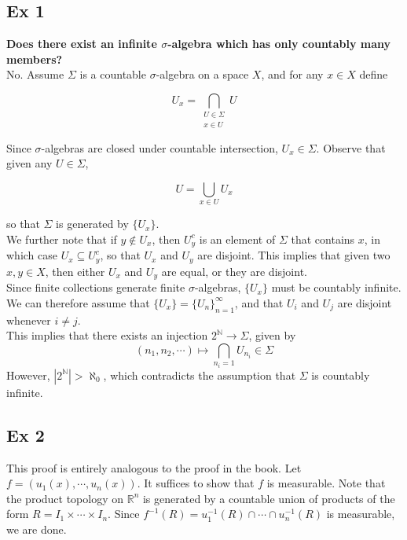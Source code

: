 \subsection{Ex 1}
\textbf{Does there exist an infinite $\sigma$-algebra which has only countably
    many members?} 
\\

No. Assume $\Sigma$ is a countable $\sigma$-algebra on a space $X$, 
and for any $x \in X$ define 

\[ U_x = \bigcap_{\substack{U \in \Sigma \\ x \in U}} U \] 

Since $\sigma$-algebras are closed under countable intersection, $U_x \in \Sigma$.
Observe that given any $U \in \Sigma$, 

\[ U = \bigcup_{x \in U} U_x \]

so that $\Sigma$ is generated by $\{U_x\}$. 
\\

We further note that if $y \not \in U_x$, then $U_{y}^c$ is an element of $\Sigma$ that contains $x$, in which case $ U_x \subseteq U_y^c$, so that $U_x$ and $U_y$ are disjoint.
This implies that given two $x, y \in X$, then either $U_x$ and $U_y$ are equal, or they are disjoint.
\\

Since finite collections generate finite $\sigma$-algebras, $\{ U_x \}$ must be countably infinite. 
We can therefore assume that $ \{ U_x \} = \{ U_n \}_{n=1}^\infty$, and that $U_i$ and $U_j$ are disjoint whenever $i \neq j$.
\\

This implies that there exists an injection $2^\mathbb{N} \to \Sigma$, given by 
\[ (n_1, n_2, \cdots ) \mapsto \bigcap_{n_i = 1} U_{n_i} \in \Sigma \]
However, $|2^{\mathbb{N}}| > \aleph_0$, which contradicts the assumption that $\Sigma$ is countably infinite.


\subsection{Ex 2}
This proof is entirely analogous to the proof in the book. 
Let $f = (u_1(x), \cdots, u_n(x))$.
It suffices to show that $f$ is measurable.
Note that the product topology on $\mathbb R^n$ is generated by a countable union of products of the form $R = I_1 \times \cdots \times I_n$.  
Since $f^{-1}(R) = u_1^{-1}(R) \cap \cdots \cap u_n^{-1}(R)$ is measurable, we are done.
